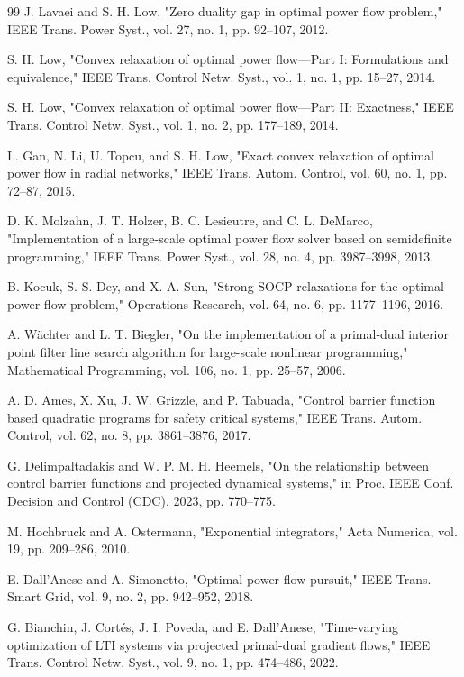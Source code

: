 \documentclass[11pt,onecolumn]{article}
\theoremstyle{definition}
\theoremstyle{remark}
\begin{document}
\begin{thebibliography}{99}
\bibitem  J. Lavaei and S. H. Low, "Zero duality gap in optimal power flow problem," IEEE Trans. Power Syst., vol. 27, no. 1, pp. 92–107, 2012.

\bibitem S. H. Low, "Convex relaxation of optimal power flow—Part I: Formulations and equivalence," IEEE Trans. Control Netw. Syst., vol. 1, no. 1, pp. 15–27, 2014.

\bibitem S. H. Low, "Convex relaxation of optimal power flow—Part II: Exactness," IEEE Trans. Control Netw. Syst., vol. 1, no. 2, pp. 177–189, 2014.

\bibitem L. Gan, N. Li, U. Topcu, and S. H. Low, "Exact convex relaxation of optimal power flow in radial networks," IEEE Trans. Autom. Control, vol. 60, no. 1, pp. 72–87, 2015.

\bibitem D. K. Molzahn, J. T. Holzer, B. C. Lesieutre, and C. L. DeMarco, "Implementation of a large-scale optimal power flow solver based on semidefinite programming," IEEE Trans. Power Syst., vol. 28, no. 4, pp. 3987–3998, 2013.

\bibitem B. Kocuk, S. S. Dey, and X. A. Sun, "Strong SOCP relaxations for the optimal power flow problem," Operations Research, vol. 64, no. 6, pp. 1177–1196, 2016.

\bibitem A. Wächter and L. T. Biegler, "On the implementation of a primal-dual interior point filter line search algorithm for large-scale nonlinear programming," Mathematical Programming, vol. 106, no. 1, pp. 25–57, 2006.

\bibitem A. D. Ames, X. Xu, J. W. Grizzle, and P. Tabuada, "Control barrier function based quadratic programs for safety critical systems," IEEE Trans. Autom. Control, vol. 62, no. 8, pp. 3861–3876, 2017.

\bibitem G. Delimpaltadakis and W. P. M. H. Heemels, "On the relationship between control barrier functions and projected dynamical systems," in Proc. IEEE Conf. Decision and Control (CDC), 2023, pp. 770–775.

\bibitem M. Hochbruck and A. Ostermann, "Exponential integrators," Acta Numerica, vol. 19, pp. 209–286, 2010.

\bibitem E. Dall'Anese and A. Simonetto, "Optimal power flow pursuit," IEEE Trans. Smart Grid, vol. 9, no. 2, pp. 942–952, 2018.

\bibitem G. Bianchin, J. Cortés, J. I. Poveda, and E. Dall'Anese, "Time-varying optimization of LTI systems via projected primal-dual gradient flows," IEEE Trans. Control Netw. Syst., vol. 9, no. 1, pp. 474–486, 2022.


\end{thebibliography}
\end{document}
